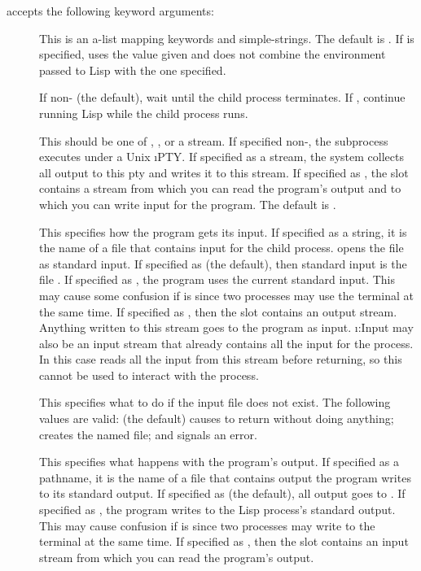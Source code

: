  accepts the following keyword arguments:
\begin{description}

\item[]
This is an a-list mapping keywords and simple-strings.  The default
is .  If  is specified,  uses
the value given and does not combine the environment passed to Lisp with the
one specified.

\item[]
If non-\nil{} (the default), wait until the child process terminates.
If \nil, continue running Lisp while the child process runs.

\item[]
This should be one of \true, \nil, or a stream.  If specified
non-\nil, the subprocess executes under a Unix \i{PTY}.  If specified as a
stream, the system collects all output to this pty and writes it to this
stream.  If specified as \true, the  slot contains a stream from
which you can read the program's output and to which you can write input for
the program.  The default is \nil.

\item[]
This specifies how the program gets its input.  If specified as a
string, it is the name of a file that contains input for the child process.
 opens the file as standard input.  If specified as \nil{} (the
default), then standard input is the file .  If specified as
\true, the program uses the current standard input.  This may cause some
confusion if  is \nil{} since two processes may use the terminal at the
same time.  If specified as , then the  slot
contains an output stream.  Anything written to this stream goes to the program
as input.  \i{:Input} may also be an input stream that already contains all the
input for the process.  In this case  reads all the input from
this stream before returning, so this cannot be used to interact with the
process.

\item[]
This specifies what to do if the input file does
not exist.  The following values are valid: \nil{} (the default) causes
 to return \nil{} without doing anything;  creates the
named file; and  signals an error.

\item[]
This specifies what happens with the program's output.  If
specified as a pathname, it is the name of a file that contains output the
program writes to its standard output.  If specified as \nil{} (the default), all
output goes to .  If specified as \true, the program writes to
the Lisp process's standard output.  This may cause confusion if  is
\nil{} since two processes may write to the terminal at the same time.  If
specified as , then the  slot contains an input
stream from which you can read the program's output.


\end{description}
